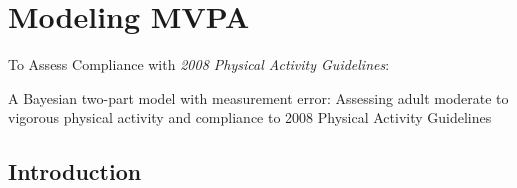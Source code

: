 \documentclass[handout]{beamer}\usepackage[]{graphicx}\usepackage[]{color}
\begin{document}
% 
% 
% 
% 
% 

\section{Modeling MVPA}
\begin{frame}
To Assess Compliance with \emph{2008 Physical Activity Guidelines}:

\vspace{0.4cm}
\huge A Bayesian two-part model with measurement error: Assessing adult moderate to vigorous physical activity and compliance to 2008 Physical Activity Guidelines

\end{frame}

\subsection{Introduction}
\end{document}
